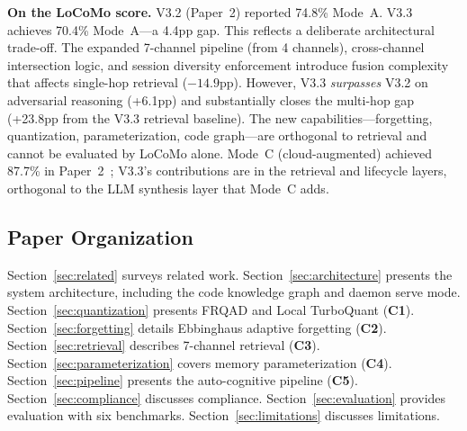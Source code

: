 \textbf{On the LoCoMo score.} V3.2 (Paper~2) reported 74.8\% Mode~A. V3.3 achieves 70.4\% Mode~A---a 4.4pp gap. This reflects a deliberate architectural trade-off. The expanded 7-channel pipeline (from 4 channels), cross-channel intersection logic, and session diversity enforcement introduce fusion complexity that affects single-hop retrieval ($-14.9$pp). However, V3.3 \emph{surpasses} V3.2 on adversarial reasoning (+6.1pp) and substantially closes the multi-hop gap (+23.8pp from the V3.3 retrieval baseline). The new capabilities---forgetting, quantization, parameterization, code graph---are orthogonal to retrieval and cannot be evaluated by LoCoMo alone. Mode~C (cloud-augmented) achieved 87.7\% in Paper~2~\cite{slm-paper2}; V3.3's contributions are in the retrieval and lifecycle layers, orthogonal to the LLM synthesis layer that Mode~C adds.

\subsection{Paper Organization}

Section~\ref{sec:related} surveys related work. Section~\ref{sec:architecture} presents the system architecture, including the code knowledge graph and daemon serve mode. Section~\ref{sec:quantization} presents FRQAD and Local TurboQuant (\textbf{C1}). Section~\ref{sec:forgetting} details Ebbinghaus adaptive forgetting (\textbf{C2}). Section~\ref{sec:retrieval} describes 7-channel retrieval (\textbf{C3}). Section~\ref{sec:parameterization} covers memory parameterization (\textbf{C4}). Section~\ref{sec:pipeline} presents the auto-cognitive pipeline (\textbf{C5}). Section~\ref{sec:compliance} discusses compliance. Section~\ref{sec:evaluation} provides evaluation with six benchmarks. Section~\ref{sec:limitations} discusses limitations.

